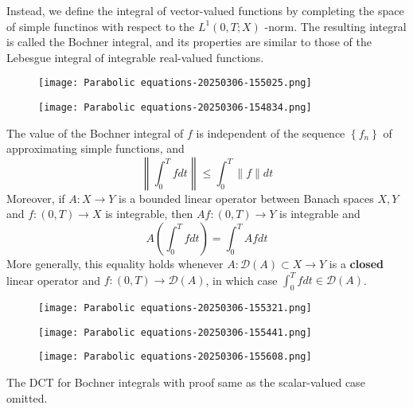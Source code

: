 Instead, we define the integral of vector-valued functions by completing the space of simple functinos with respect to the $L^{1}(0,T;X)$ -norm. The resulting integral is called the Bochner integral, and its properties are similar to those of the Lebesgue integral of integrable real-valued functions.

\begin{definition}
\begin{figure}[H]
\centering
\texttt{[image: Parabolic equations-20250306-155025.png]}
\label{}
\end{figure}
\end{definition}
\begin{definition}
\begin{figure}[H]
\centering
\texttt{[image: Parabolic equations-20250306-154834.png]}
\label{}
\end{figure}
\end{definition}
The value of the Bochner integral of $f$ is independent of the sequence $\left\{f_n\right\}$ of approximating simple functions, and
\[
\left\|\int_0^T f d t\right\| \leq \int_0^T\|f\| d t
\]
Moreover, if $A: X \rightarrow Y$ is a bounded linear operator between Banach spaces $X, Y$ and $f:(0, T) \rightarrow X$ is integrable, then $A f:(0, T) \rightarrow Y$ is integrable and
\[
A\left(\int_0^T f d t\right)=\int_0^T A f d t
\]
More generally, this equality holds whenever $A: \mathcal{D}(A) \subset X \rightarrow Y$ is a \textbf{closed} linear operator and $f:(0, T) \rightarrow \mathcal{D}(A)$, in which case $\int_0^T f d t \in \mathcal{D}(A)$.

\begin{definition}
\begin{figure}[H]
\centering
\texttt{[image: Parabolic equations-20250306-155321.png]}
\label{}
\end{figure}
\end{definition}
\begin{example}
\begin{figure}[H]
\centering
\texttt{[image: Parabolic equations-20250306-155441.png]}
\label{}
\end{figure}
\end{example}
\begin{theorem}
\begin{figure}[H]
\centering
\texttt{[image: Parabolic equations-20250306-155608.png]}
\label{}
\end{figure}
\end{theorem}
The DCT for Bochner integrals with proof same as the scalar-valued case omitted.

